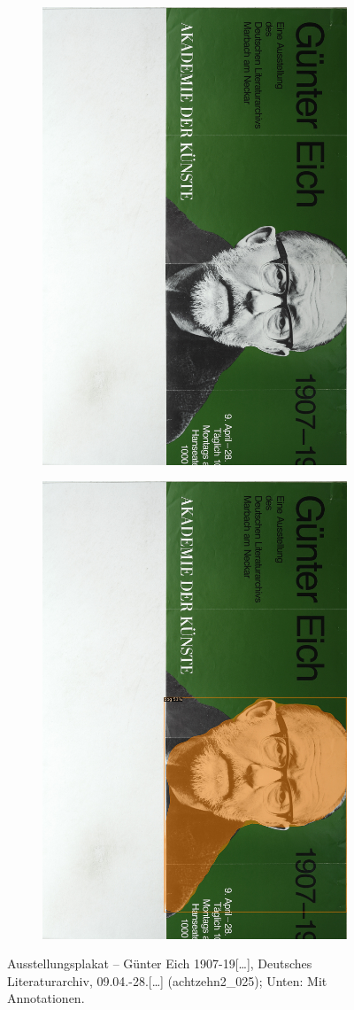 \documentclass[a4paper,12pt,ngerman]{article}
\begin{document}
\newpage
\begin{figure}[ht]
	\begin{subfigure}[b]{\linewidth}
	\centering
	\includegraphics[height=\linewidth, angle=90]{Abbildung_52_(achtzehn2_025)}
	\end{subfigure}
	\begin{subfigure}[b]{\linewidth}
	\centering
	\includegraphics[height=\linewidth, angle=90]{Abbildung_52_(achtzehn2_025)_with_detections}
	\end{subfigure}
	\caption{Ausstellungsplakat – Günter Eich 1907-19[…], Deutsches Literaturarchiv, 09.04.-28.[…] (achtzehn2\_025); Unten: Mit Annotationen.}
\end{figure}
\end{document}
